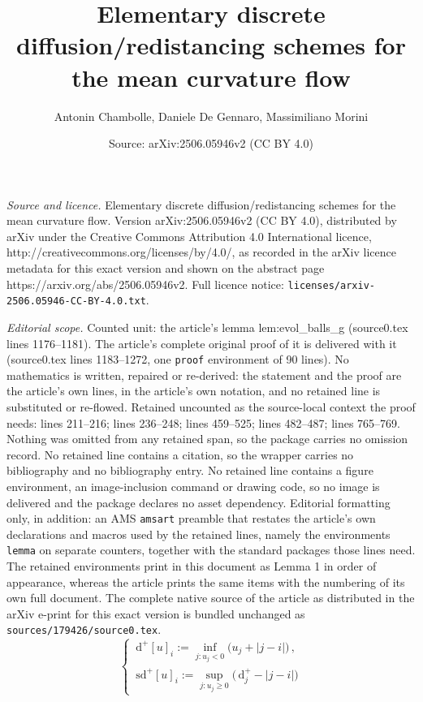 \documentclass[10pt,a4paper]{amsart}
\title{Elementary discrete diffusion/redistancing schemes for the mean curvature flow}
\author{Antonin Chambolle, Daniele De Gennaro, Massimiliano Morini}
\date{Source: arXiv:2506.05946v2 (CC BY 4.0)}
\newcommand{\sd}{\,\mathrm{sd}}
\newcommand{\ud}{\,\mathrm{d}}
\begin{document}
\maketitle

\noindent\emph{Source and licence.} Elementary discrete diffusion/redistancing schemes for the mean curvature flow. Version arXiv:2506.05946v2 (CC BY 4.0), distributed by arXiv under the Creative Commons Attribution 4.0 International licence, http://creativecommons.org/licenses/by/4.0/, as recorded in the arXiv licence metadata for this exact version and shown on the abstract page https://arxiv.org/abs/2506.05946v2. Full licence notice: \texttt{licenses/arxiv-2506.05946-CC-BY-4.0.txt}.\par\smallskip

\noindent\textit{Editorial scope.} Counted unit: the article's lemma lem:evol\_balls\_g (source0.tex lines 1176--1181). The article's complete original proof of it is delivered with it (source0.tex lines 1183--1272, one \texttt{proof} environment of 90 lines). No mathematics is written, repaired or re-derived: the statement and the proof are the article's own lines, in the article's own notation, and no retained line is substituted or re-flowed.  Retained uncounted as the source-local context the proof needs: lines 211--216; lines 236--248; lines 459--525; lines 482--487; lines 765--769.  Nothing was omitted from any retained span, so the package carries no omission record.  No retained line contains a citation, so the wrapper carries no bibliography and no bibliography entry.  No retained line contains a figure environment, an image-inclusion command or drawing code, so no image is delivered and the package declares no asset dependency.  Editorial formatting only, in addition: an AMS \texttt{amsart} preamble that restates the article's own declarations and macros used by the retained lines, namely the environments \texttt{lemma} on separate counters, together with the standard packages those lines need.  The retained environments print in this document as Lemma 1 in order of appearance, whereas the article prints the same items with the numbering of its own full document.  The complete native source of the article as distributed in the arXiv e-print for this exact version is bundled unchanged as \texttt{sources/179426/source0.tex}.
\begin{equation}\label{eq:sdp}
  \begin{cases}
    \ud^+[u]_i := \inf_{j:u_j<0}  {(} u_j + |j-i| {)}\,,\\
    \sd^+[u]_i := \sup_{j:u_j\ge 0}  {(} \ud^+_j - |j-i|  {)}
  \end{cases}
\end{equation}
\end{document}

